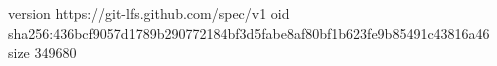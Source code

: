 version https://git-lfs.github.com/spec/v1
oid sha256:436bcf9057d1789b290772184bf3d5fabe8af80bf1b623fe9b85491c43816a46
size 349680
